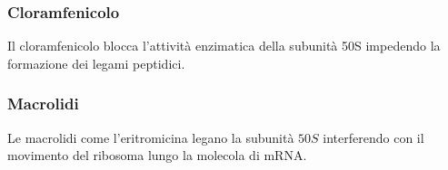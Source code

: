 		\subsubsection{Cloramfenicolo}
		Il cloramfenicolo blocca l'attività enzimatica della subunità 50S impedendo la formazione dei legami peptidici. 

		\subsubsection{Macrolidi}
		Le macrolidi come l'eritromicina legano la subunità $50S$ interferendo con il movimento del ribosoma lungo la molecola di mRNA. 
